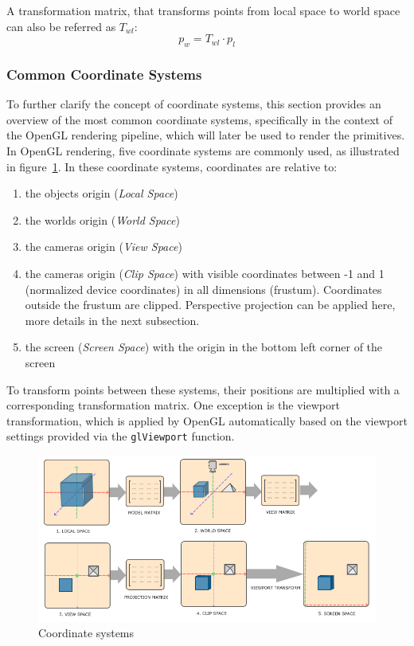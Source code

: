 A transformation matrix, that transforms points from local space to world space can also be referred as $T_{wl}$:
\begin{equation}
    p_w = T_{wl} \cdot p_l
\end{equation}

\cite{dorner_virtual_2019}

\subsubsection{Common Coordinate Systems}\label{sec:coordinate-systems}
To further clarify the concept of coordinate systems, this section provides an overview of the most common coordinate systems,
specifically in the context of the OpenGL rendering pipeline, which will later be used to render the primitives.
In OpenGL rendering, five coordinate systems are commonly used, as illustrated in figure~\ref{fig:coordinate-systems}.
In these coordinate systems, coordinates are relative to:
\begin{enumerate}
    \item the objects origin (\textit{Local Space})
    \item the worlds origin (\textit{World Space})
    \item the cameras origin (\textit{View Space})
    \item the cameras origin (\textit{Clip Space}) with visible coordinates between -1 and 1 (normalized device coordinates) in all dimensions (frustum).
    Coordinates outside the frustum are clipped.
    Perspective projection can be applied here, more details in the next subsection.
    \item the screen (\textit{Screen Space})  with the origin in the bottom left corner of the screen
\end{enumerate}
To transform points between these systems, their positions are multiplied with a corresponding transformation matrix.
One exception is the viewport transformation,
which is applied by OpenGL automatically based on the viewport settings provided via the \texttt{glViewport} function.

\begin{figure}[h!]
    \centering
    \includegraphics[width=\linewidth]{images/coordinate_systems}
    \caption{Coordinate systems}
    \label{fig:coordinate-systems}
\end{figure}

